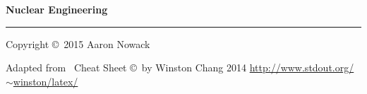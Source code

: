 \documentclass[10pt,landscape]{article}
\begin{document}
\footnotesize
\begin{multicols*}{3}

\setlength{\premulticols}{1pt}
\setlength{\postmulticols}{1pt}
\setlength{\multicolsep}{1pt}
\setlength{\columnsep}{2pt}

\begin{center}
     \Large{\textbf{Nuclear Engineering}} \\
\end{center}













\rule{0.3\linewidth}{0.25pt}
\scriptsize

Copyright \copyright\ 2015 Aaron Nowack

Adapted from \LaTeXe\ Cheat Sheet \copyright\ by Winston Chang 2014
\href{http://www.stdout.org/~winston/latex/}{http://www.stdout.org/$\sim$winston/latex/}


\end{multicols*}
\end{document}
